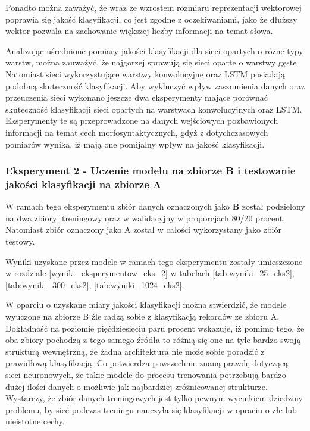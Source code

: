 Ponadto można zaważyć, że wraz ze wzrostem rozmiaru reprezentacji wektorowej poprawia się jakość klasyfikacji, co jest zgodne z oczekiwaniami, jako że dłuższy wektor pozwala na zachowanie większej liczby informacji na temat słowa.


Analizując uśrednione pomiary jakości klasyfikacji dla sieci opartych o różne typy warstw, można zauważyć, że najgorzej sprawują się sieci oparte o warstwy gęste. Natomiast sieci wykorzystujące warstwy konwolucyjne oraz LSTM posiadają podobną skuteczność klasyfikacji. Aby wykluczyć wpływ zaszumienia danych oraz przeuczenia sieci wykonano jeszcze dwa eksperymenty mające porównać skuteczność klasyfikacji sieci opartych na warstwach konwolucyjnych oraz LSTM. Eksperymenty te są przeprowadzone na danych wejściowych pozbawionych informacji na temat cech morfosyntaktycznych, gdyż z dotychczasowych pomiarów wynika, iż mają one pomijalny wpływ na jakość klasyfikacji.


\subsubsection{Eksperyment 2 - Uczenie modelu na zbiorze B i testowanie jakości klasyfikacji na zbiorze A }

W ramach tego eksperymentu zbiór danych oznaczonych jako \textbf{B} został podzielony na dwa zbiory: treningowy oraz w walidacyjny w proporcjach 80/20 procent. Natomiast zbiór oznaczony jako A został w całości wykorzystany jako zbiór testowy.

Wyniki uzyskane przez modele w ramach tego eksperymentu zostały umieszczone w rozdziale \ref{wyniki_eksperymentow_eks_2} w tabelach \ref{tab:wyniki_25_eks2}, \ref{tab:wyniki_300_eks2}, \ref{tab:wyniki_1024_eks2}.


W oparciu o uzyskane miary jakości klasyfikacji można stwierdzić, że modele wyuczone na zbiorze B źle radzą sobie z klasyfikacją rekordów ze zbioru A. Dokładność na poziomie pięćdziesięciu paru procent wskazuje, iż pomimo tego, że oba zbiory pochodzą z tego samego źródła to różnią się one na tyle bardzo swoją strukturą wewnętrzną, że żadna architektura nie może sobie poradzić z prawidłową klasyfikacją. Co potwierdza powszechnie znaną prawdę dotyczącą sieci neuronowych, że takie modele do procesu trenowania potrzebują bardzo dużej ilości danych o możliwie jak najbardziej zróżnicowanej strukturze. Wystarczy, że zbiór danych treningowych jest tylko pewnym wycinkiem dziedziny problemu, by sieć podczas treningu nauczyła się klasyfikacji w opraciu o złe lub nieistotne cechy.


